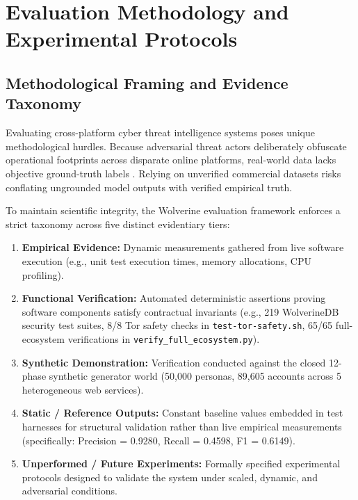 \chapter{Evaluation Methodology and Experimental Protocols}
\label{ch:evaluation}

\section{Methodological Framing and Evidence Taxonomy}
\label{sec:eval_problem}

Evaluating cross-platform cyber threat intelligence systems poses unique methodological hurdles. Because adversarial threat actors deliberately obfuscate operational footprints across disparate online platforms, real-world data lacks objective ground-truth labels \cite{soska2015measuring}. Relying on unverified commercial datasets risks conflating ungrounded model outputs with verified empirical truth. 

To maintain scientific integrity, the Wolverine evaluation framework enforces a strict taxonomy across five distinct evidentiary tiers:

\begin{enumerate}[label=\textbf{Tier \Alph*:}, leftmargin=2.5em]
    \item \textbf{Empirical Evidence:} Dynamic measurements gathered from live software execution (e.g., unit test execution times, memory allocations, CPU profiling).
    \item \textbf{Functional Verification:} Automated deterministic assertions proving software components satisfy contractual invariants (e.g., 219 WolverineDB security test suites, 8/8 Tor safety checks in \texttt{test-tor-safety.sh}, 65/65 full-ecosystem verifications in \texttt{verify\_full\_ecosystem.py}).
    \item \textbf{Synthetic Demonstration:} Verification conducted against the closed 12-phase synthetic generator world (50,000 personas, 89,605 accounts across 5 heterogeneous web services).
    \item \textbf{Static / Reference Outputs:} Constant baseline values embedded in test harnesses for structural validation rather than live empirical measurements (specifically: Precision = 0.9280, Recall = 0.4598, F1 = 0.6149).
    \item \textbf{Unperformed / Future Experiments:} Formally specified experimental protocols designed to validate the system under scaled, dynamic, and adversarial conditions.
\end{enumerate}

